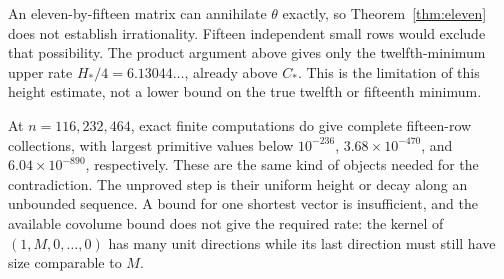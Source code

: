 An eleven-by-fifteen matrix can annihilate $\theta$ exactly, so
Theorem~\ref{thm:eleven} does not establish irrationality. Fifteen
independent small rows would exclude that possibility. The product
argument above gives only the twelfth-minimum upper rate
$H_*/4=6.13044\ldots$, already above $C_*$. This is the limitation
of this height estimate, not a lower bound on the true twelfth or
fifteenth minimum.

At $n=116,232,464$, exact finite computations do give complete
fifteen-row collections, with largest primitive values below
$10^{-236}$, $3.68\times10^{-470}$, and $6.04\times10^{-890}$,
respectively. These are the same kind of objects needed for the
contradiction. The unproved step is their uniform height or decay
along an unbounded sequence. A bound for one shortest vector is
insufficient, and the available covolume bound does not give the
required rate: the kernel of
$(1,M,0,\ldots,0)$ has many unit directions while its last direction
must still have size comparable to $M$.
